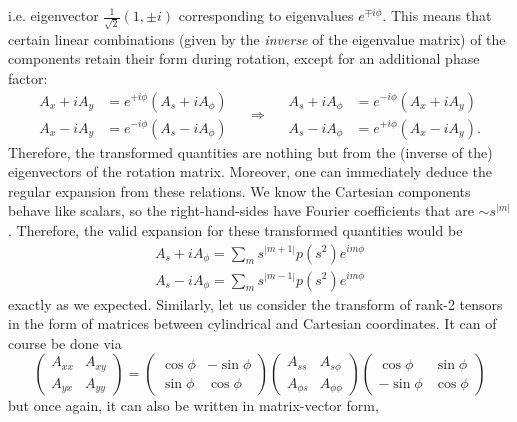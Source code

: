 i.e. eigenvector $\frac{1}{\sqrt{2}}(1, \pm i)$ corresponding to eigenvalues $e^{\mp i\phi}$. This means that certain linear combinations (given by the \textit{inverse} of the eigenvalue matrix) of the components retain their form during rotation, except for an additional phase factor:
\[\begin{aligned}
    A_x + iA_y &= e^{+i\phi} \left(A_s + iA_\phi\right) \\ 
    A_x - iA_y &= e^{-i\phi} \left(A_s - iA_\phi\right)
\end{aligned} \quad \Longrightarrow\quad 
\begin{aligned}
    A_s + iA_\phi &= e^{-i\phi} \left(A_x + iA_y\right) \\ 
    A_s - iA_\phi &= e^{+i\phi} \left(A_x - iA_y\right).
\end{aligned}\]
Therefore, the transformed quantities are nothing but from the (inverse of the) eigenvectors of the rotation matrix.
Moreover, one can immediately deduce the regular expansion from these relations.
We know the Cartesian components behave like scalars, so the right-hand-sides have Fourier coefficients that are $\sim s^{|m|}$.
Therefore, the valid expansion for these transformed quantities would be
\[\begin{aligned}
    A_s + iA_\phi = \sum_m s^{|m+1|}p(s^2) e^{im\phi} \\ 
    A_s - iA_\phi = \sum_m s^{|m-1|}p(s^2) e^{im\phi}
\end{aligned}\]
exactly as we expected.
Similarly, let us consider the transform of rank-2 tensors in the form of matrices between cylindrical and Cartesian coordinates.
It can of course be done via
\[\begin{pmatrix} A_{xx} & A_{xy} \\ A_{yx} & A_{yy} \end{pmatrix} = 
\begin{pmatrix} \cos\phi & -\sin\phi \\ \sin\phi & \cos\phi \end{pmatrix}  
\begin{pmatrix} A_{ss} & A_{s\phi} \\ A_{\phi s} & A_{\phi \phi} \end{pmatrix}
\begin{pmatrix} \cos\phi & \sin\phi \\ -\sin\phi & \cos\phi \end{pmatrix}
\]
but once again, it can also be written in matrix-vector form,
